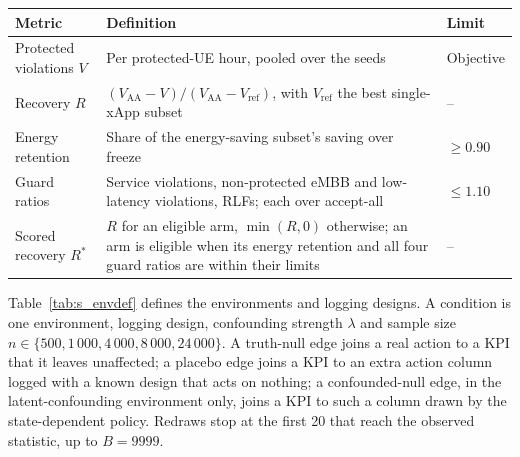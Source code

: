 \documentclass[pdflatex,sn-mathphys-num]{sn-jnl}%
\theoremstyle{thmstyleone}%
\theoremstyle{thmstyletwo}%
\theoremstyle{thmstylethree}%
\begin{document}
\begin{table}[tbp]
\begin{tabular*}{\textwidth}{@{\extracolsep{\fill}}>{\raggedright}p{}>{\raggedright}p{}>{\raggedright\arraybackslash}p{}@{}}
\toprule
Metric & Definition & Limit \\
\midrule
Protected violations $V$ & Per protected-UE hour, pooled over the seeds & Objective \\
Recovery $R$ & $(V_{\mathrm{AA}} - V) / (V_{\mathrm{AA}} - V_{\mathrm{ref}})$, with $V_{\mathrm{ref}}$ the best single-xApp subset & -- \\
Energy retention & Share of the energy-saving subset's saving over freeze & $\ge 0.90$ \\
Guard ratios & Service violations, non-protected eMBB and low-latency violations, RLFs; each over accept-all & $\le 1.10$ \\
Scored recovery $R^{*}$ & $R$ for an eligible arm, $\min(R, 0)$ otherwise; an arm is eligible when its energy retention and all four guard ratios are within their limits & -- \\
\bottomrule
\end{tabular*}
\end{table}

Table~\ref{tab:s_envdef} defines the environments and logging designs. A condition is one environment, logging design, confounding strength $\lambda$ and sample size $n \in \{500, 1\,000, 4\,000, 8\,000, 24\,000\}$. A truth-null edge joins a real action to a KPI that it leaves unaffected; a placebo edge joins a KPI to an extra action column logged with a known design that acts on nothing; a confounded-null edge, in the latent-confounding environment only, joins a KPI to such a column drawn by the state-dependent policy. Redraws stop at the first 20 that reach the observed statistic, up to $B = 9999$.
\end{document}
